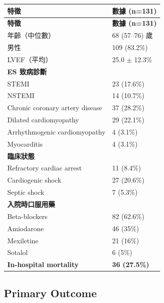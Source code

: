 \documentclass[12pt,a4paper]{article}
\begin{document}
\begin{longtable}{p{6cm}p{4cm}}
\toprule
\textbf{特徵} & \textbf{數據 (n=131)} \\
\midrule
\endfirsthead

\toprule
\textbf{特徵} & \textbf{數據 (n=131)} \\
\midrule
\endhead

\bottomrule
\endfoot

年齡（中位數） & 68 (57--76) 歲 \\
男性 & 109 (83.2\%) \\
LVEF（平均） & 25.0 $\pm$ 12.3\% \\
\midrule
\multicolumn{2}{l}{\textbf{ES 致病診斷}} \\
STEMI & 23 (17.6\%) \\
NSTEMI & 14 (10.7\%) \\
Chronic coronary artery disease & 37 (28.2\%) \\
Dilated cardiomyopathy & 29 (22.1\%) \\
Arrhythmogenic cardiomyopathy & 4 (3.1\%) \\
Myocarditis & 4 (3.1\%) \\
\midrule
\multicolumn{2}{l}{\textbf{臨床狀態}} \\
Refractory cardiac arrest & 11 (8.4\%) \\
Cardiogenic shock & 27 (20.6\%) \\
Septic shock & 7 (5.3\%) \\
\midrule
\multicolumn{2}{l}{\textbf{入院時口服用藥}} \\
Beta-blockers & 82 (62.6\%) \\
Amiodarone & 46 (35\%) \\
Mexiletine & 21 (16\%) \\
Sotalol & 6 (5\%) \\
\midrule
\textbf{In-hospital mortality} & \textbf{36 (27.5\%)} \\
\bottomrule
\end{longtable}

\subsection{Primary Outcome}

\end{document}
